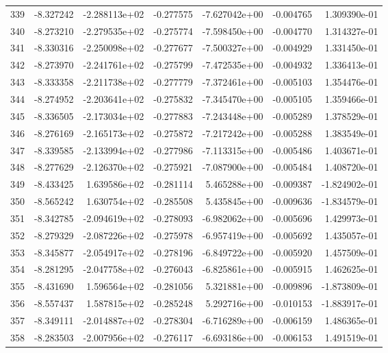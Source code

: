 \begin{tabular}{rrrrrrr}
 339 &  -8.327242 & -2.288113e+02 & -0.277575 & -7.627042e+00 &  -0.004765 &  1.309390e-01 \\
 340 &  -8.273210 & -2.279535e+02 & -0.275774 & -7.598450e+00 &  -0.004770 &  1.314327e-01 \\
 341 &  -8.330316 & -2.250098e+02 & -0.277677 & -7.500327e+00 &  -0.004929 &  1.331450e-01 \\
 342 &  -8.273970 & -2.241761e+02 & -0.275799 & -7.472535e+00 &  -0.004932 &  1.336413e-01 \\
 343 &  -8.333358 & -2.211738e+02 & -0.277779 & -7.372461e+00 &  -0.005103 &  1.354476e-01 \\
 344 &  -8.274952 & -2.203641e+02 & -0.275832 & -7.345470e+00 &  -0.005105 &  1.359466e-01 \\
 345 &  -8.336505 & -2.173034e+02 & -0.277883 & -7.243448e+00 &  -0.005289 &  1.378529e-01 \\
 346 &  -8.276169 & -2.165173e+02 & -0.275872 & -7.217242e+00 &  -0.005288 &  1.383549e-01 \\
 347 &  -8.339585 & -2.133994e+02 & -0.277986 & -7.113315e+00 &  -0.005486 &  1.403671e-01 \\
 348 &  -8.277629 & -2.126370e+02 & -0.275921 & -7.087900e+00 &  -0.005484 &  1.408720e-01 \\
 349 &  -8.433425 &  1.639586e+02 & -0.281114 &  5.465288e+00 &  -0.009387 & -1.824902e-01 \\
 350 &  -8.565242 &  1.630754e+02 & -0.285508 &  5.435845e+00 &  -0.009636 & -1.834579e-01 \\
 351 &  -8.342785 & -2.094619e+02 & -0.278093 & -6.982062e+00 &  -0.005696 &  1.429973e-01 \\
 352 &  -8.279329 & -2.087226e+02 & -0.275978 & -6.957419e+00 &  -0.005692 &  1.435057e-01 \\
 353 &  -8.345877 & -2.054917e+02 & -0.278196 & -6.849722e+00 &  -0.005920 &  1.457509e-01 \\
 354 &  -8.281295 & -2.047758e+02 & -0.276043 & -6.825861e+00 &  -0.005915 &  1.462625e-01 \\
 355 &  -8.431690 &  1.596564e+02 & -0.281056 &  5.321881e+00 &  -0.009896 & -1.873809e-01 \\
 356 &  -8.557437 &  1.587815e+02 & -0.285248 &  5.292716e+00 &  -0.010153 & -1.883917e-01 \\
 357 &  -8.349111 & -2.014887e+02 & -0.278304 & -6.716289e+00 &  -0.006159 &  1.486365e-01 \\
 358 &  -8.283503 & -2.007956e+02 & -0.276117 & -6.693186e+00 &  -0.006153 &  1.491519e-01 \\

\end{tabular}
